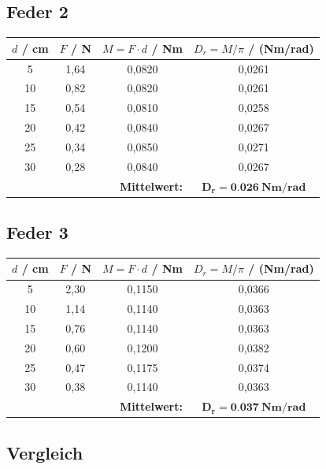 \documentclass[11pt,a4paper]{scrartcl}
\begin{document}
\subsection*{Feder 2}

\begin{center}
	\renewcommand{\arraystretch}{1.4}
	\begin{tabular}{|c|c|c|c|}
		\hline
		$d$ / cm & $F$ / N & $M = F \cdot d$ / Nm & $D_r = M/\pi$ / (Nm/rad) \\
		\hline
		5  & 1,64 & 0,0820 & 0,0261 \\
		\hline
		10 & 0,82 & 0,0820 & 0,0261 \\
		\hline
		15 & 0,54 & 0,0810 & 0,0258 \\
		\hline
		20 & 0,42 & 0,0840 & 0,0267 \\
		\hline
		25 & 0,34 & 0,0850 & 0,0271 \\
		\hline
		30 & 0,28 & 0,0840 & 0,0267 \\
		\hline
		\multicolumn{3}{|r|}{\textbf{Mittelwert:}} & $\boldsymbol{D_r = \SI{0,026}{Nm/rad}}$ \\
		\hline
	\end{tabular}
\end{center}

\subsection*{Feder 3}

\begin{center}
	\renewcommand{\arraystretch}{1.4}
	\begin{tabular}{|c|c|c|c|}
		\hline
		$d$ / cm & $F$ / N & $M = F \cdot d$ / Nm & $D_r = M/\pi$ / (Nm/rad) \\
		\hline
		5  & 2,30 & 0,1150 & 0,0366 \\
		\hline
		10 & 1,14 & 0,1140 & 0,0363 \\
		\hline
		15 & 0,76 & 0,1140 & 0,0363 \\
		\hline
		20 & 0,60 & 0,1200 & 0,0382 \\
		\hline
		25 & 0,47 & 0,1175 & 0,0374 \\
		\hline
		30 & 0,38 & 0,1140 & 0,0363 \\
		\hline
		\multicolumn{3}{|r|}{\textbf{Mittelwert:}} & $\boldsymbol{D_r = \SI{0,037}{Nm/rad}}$ \\
		\hline
	\end{tabular}
\end{center}

\subsection*{Vergleich}
\end{document}
